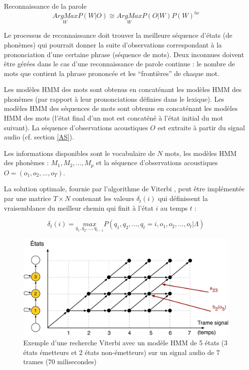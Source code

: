 \documentclass{style/these}
\let\oldcite=\cite
\renewcommand{\cite}[1]{{\fontfamily{qcs}\selectfont{\color{darkerblue}[\oldcite{#1}]}}}
\begin{document}
\begin{part}{Reconnaissance de la parole}
$$\underset{W}{ArgMax} P(W|O) \cong \underset{W}{ArgMax} P(O|W)P(W)^{lw}$$


Le processus de reconnaissance doit trouver la meilleure séquence d'états (de phonèmes) qui pourrait donner la suite d'observations correspondant à la prononciation d'une certaine phrase (séquence de mots). 
Deux inconnues doivent être gérées dans le cas d'une reconnaissance de parole continue : le nombre de mots que contient la phrase prononcée et les ``frontières'' de chaque mot. 

Les modèles \acrshort{HMM} des mots sont obtenus en concaténant les modèles \acrshort{HMM} des phonèmes (par rapport à leur prononciations définies dans le lexique). 
Les modèles \acrshort{HMM} des séquences de mots sont obtenus en concaténant les modèles \acrshort{HMM} des mots (l'état final d'un mot est concaténé à l'état initial du mot suivant). 
La séquence d'observations acoustiques $O$ est extraite à partir du signal audio (cf. section \ref{AS}).  

Les informations disponibles sont le vocabulaire de $N$ mots, les modèles \acrshort{HMM} des phonèmes : $M_1, M_2, ..., M_p$ et la séquence d'observations acoustiques $O = (o_1, o_2, ..., o_T)$.

La solution optimale, fournie par l'algorithme de Viterbi \cite{Viterbi:1967}, peut être implémentée par une matrice $T \times N$ contenant les valeurs $\delta_t(i)$ qui définissent la vraisemblance du meilleur chemin qui finit à l'état $i$ au temps $t$ :

\begin{equation}
	\delta_t(i) = \underset{q_1,q_2,...,q_{t-1}}{max} P(q_1, q_2, ..., q_t=i, o_1, o_2, ..., o_t | \Lambda)
\end{equation}

\begin{figure}[h!]
\centering
\includegraphics[scale=0.33]{images/pictures/Viterbi.pdf}
\caption{Exemple d'une recherche Viterbi avec un modèle \acrshort{HMM} de 5 états (3 états émetteurs et 2 états non-émetteurs) sur un signal audio de 7 trames (70 milisecondes)}
\label{Fig:Viterbi}
\end{figure}



\end{part}
\end{document}
